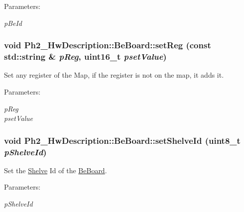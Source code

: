 \begin{Desc}
\item[Parameters:]
\begin{description}
\item[{\em p\-Be\-Id}]\end{description}
\end{Desc}
\hypertarget{class_ph2___hw_description_1_1_be_board_84cf502132f9391e0ac7c53d230c3ea0}{
\subsubsection[setReg]{\setlength{\rightskip}{0pt plus 5cm}void Ph2\_\-Hw\-Description::Be\-Board::set\-Reg (const std::string \& {\em p\-Reg}, uint16\_\-t {\em pset\-Value})}}
\label{class_ph2___hw_description_1_1_be_board_84cf502132f9391e0ac7c53d230c3ea0}


Set any register of the Map, if the register is not on the map, it adds it. 

\begin{Desc}
\item[Parameters:]
\begin{description}
\item[{\em p\-Reg}]\item[{\em pset\-Value}]\end{description}
\end{Desc}
\hypertarget{class_ph2___hw_description_1_1_be_board_cce2ea02abfd36f32a10a900a805f8de}{
\subsubsection[setShelveId]{\setlength{\rightskip}{0pt plus 5cm}void Ph2\_\-Hw\-Description::Be\-Board::set\-Shelve\-Id (uint8\_\-t {\em p\-Shelve\-Id})}}
\label{class_ph2___hw_description_1_1_be_board_cce2ea02abfd36f32a10a900a805f8de}


Set the \hyperlink{class_ph2___hw_description_1_1_shelve}{Shelve} Id of the \hyperlink{class_ph2___hw_description_1_1_be_board}{Be\-Board}. 

\begin{Desc}
\item[Parameters:]
\begin{description}
\item[{\em p\-Shelve\-Id}]\end{description}
\end{Desc}


